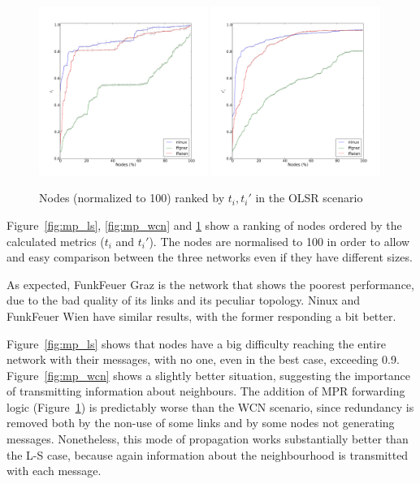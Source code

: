 \documentclass[a4paper,11pt,twoside,openright]{memoir}
\newcommand{\figref}[1] {Figure~\ref{#1}}
\begin{document}
\begin{figure}[htb]
  \centering
  \hspace*{\fill}
  \includegraphics[width=0.49\textwidth]{graphs/all-mpr-Tc}
  \hfill
  \includegraphics[width=0.49\textwidth]{graphs/all-mpr-Rc}
  \hspace*{\fill}
  \caption{Nodes (normalized to 100) ranked by $t_i, t_i'$ in the OLSR scenario}
  \label{fig:mp_olsr}
\end{figure}

\figref{fig:mp_ls}, \ref{fig:mp_wcn} and \ref{fig:mp_olsr} show a ranking of
nodes ordered by the calculated metrics ($t_i$ and $t_i'$). The nodes are
normalised to 100 in order to allow and easy comparison between the three
networks even if they have different sizes.

As expected, FunkFeuer Graz is the network that shows the poorest performance,
due to the bad quality of its links and its peculiar topology. Ninux and
FunkFeuer Wien have similar results, with the former responding a bit better.

\figref{fig:mp_ls} shows that nodes have a big difficulty reaching the entire
network with their messages, with no one, even in the best case, exceeding 0.9.
\figref{fig:mp_wcn} shows a slightly better situation, suggesting 
the importance of transmitting information about neighbours.
The addition of MPR forwarding logic (\figref{fig:mp_olsr})
is predictably worse than the WCN scenario,
since redundancy is removed both by the non-use of some links and by some nodes
not generating messages. Nonetheless, this mode of propagation works
substantially better than the L-S case, because again information about the
neighbourhood is transmitted with each message.
\end{document}
